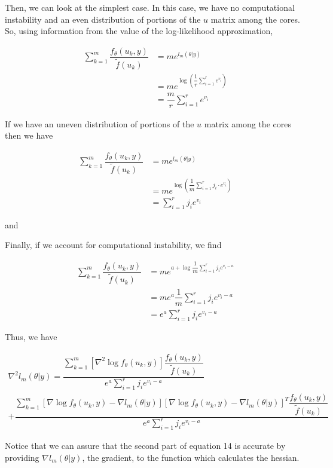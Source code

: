 \documentclass{article}
\begin{document}
\noindent Then, we can look at the simplest case. In this case, we have no computational instability and an even distribution of portions of the $u$ matrix among the cores. So, using information from the value of the log-likelihood approximation,

\begin{align}
\sum\limits_{k=1}^m \dfrac{f_\theta(u_k, y)}{\tilde{f}(u_k)} &= m e^{l_m(\theta|y)} \\
&= m e^{\log{(\dfrac{1}{r} \sum_{i=1}^r e^{v_i})}} \\
&= \dfrac{m}{r} \sum_{i=1}^r e^{v_i}
\end{align}

\noindent If we have an uneven distribution of portions of the $u$ matrix among the cores then we have

\begin{align}
\sum\limits_{k=1}^m \dfrac{f_\theta(u_k, y)}{\tilde{f}(u_k)} &= m e^{l_m(\theta|y)} \\
&= m e^{\log{(\dfrac{1}{m}\sum\limits_{i=1}^r j_i \cdot e^{v_i})}} \\
&= \sum_{i=1}^r j_i e^{v_i}
\end{align}

\noindent and 

\noindent Finally, if we account for computational instability, we find

\begin{align}
\sum\limits_{k=1}^m \dfrac{f_\theta(u_k, y)}{\tilde{f}(u_k)} &= m e^{a + \log{\dfrac{1}{m} \sum_{i=1}^r j_i e^{v_i -a}}} \\
&= m e^a \dfrac{1}{m} \sum_{i=1}^r j_i e^{v_i - a} \\
&= e^a \sum_{i=1}^r j_i e^{v_i - a}
\end{align}

\noindent Thus, we have

\begin{multline}
\nabla^2 l_m(\theta|y)= \dfrac{   \sum_{k=1}^m \left[ \nabla^2 \log f_\theta(u_k,y)     \right]  \dfrac{ f_\theta(u_k,y)}{\tilde{f}(u_k)}  }{e^a \sum_{i=1}^r j_i e^{v_i - a}}\\
+ \dfrac{   \sum_{k=1}^m \left[ \nabla \log f_\theta(u_k,y)  - \nabla l_m(\theta|y)   \right] \left[ \nabla \log f_\theta(u_k,y)  -\nabla l_m(\theta|y)  \right]^T  \dfrac{ f_\theta(u_k,y)   }{\tilde{f}(u_k)}   }{e^a \sum_{i=1}^r j_i e^{v_i - a}}
\end{multline}

\noindent Notice that we can assure that the second part of equation 14 is accurate by providing $\nabla l_m (\theta|y)$, the gradient, to the function which calculates the hessian.
\end{document}
